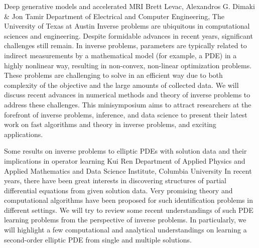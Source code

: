 \begin{addmargin}[2em]{0em}
\vspace{1.5ex}
\abs
{Deep generative models and accelerated MRI}
{Brett Levac, Alexandros G. Dimaki \& Jon Tamir}
{Department of Electrical and Computer Engineering,  The University of Texas at Austin}
{Inverse problems are ubiquitous in computational sciences and engineering. Despite formidable advances in recent years, significant challenges still remain. In inverse problems, parameters are typically related to indirect measurements by a mathematical model (for example, a PDE) in a highly nonlinear way, resulting in non-convex, non-linear optimization problems. These problems are challenging to solve in an efficient way due to both complexity of the objective and the large amounts of collected data. We will discuss recent advances in numerical methods and theory of inverse problems to address these challenges. This minisymposium aims to attract researchers at the forefront of inverse problems, inference, and data science to present their latest work on fast algorithms and theory in inverse problems, and exciting applications.}


\vspace{1.5ex}
\abs
{Some results on inverse problems to elliptic {PDE}s with solution data and their implications in operator learning}
{Kui Ren}
{Department of Applied Physics and Applied Mathematics and Data Science Institute, Columbia University}
{In recent years, there have been great interests in discovering structures of partial differential equations from given solution data. Very promising theory and computational algorithms have been proposed for such identification problems in different settings. We will try to review some recent understandings of such PDE learning problems from the perspective of inverse problems. In particularly, we will highlight a few computational and analytical understandings on learning a second-order elliptic PDE from single and multiple solutions.}



\end{addmargin}
